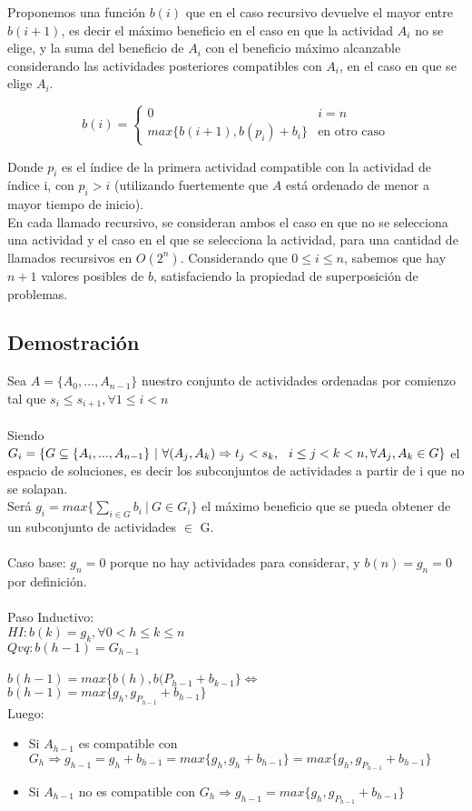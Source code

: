 \documentclass[10pt, a4paper]{article}
\begin{document}
Proponemos una función $b(i)$ que en el caso recursivo devuelve el mayor entre $b(i+1)$, es decir el máximo beneficio en el caso en que la actividad $A_i$ no se elige, y la suma del beneficio de $A_i$ con el beneficio máximo alcanzable considerando las actividades posteriores compatibles con $A_i$, en el caso en que se elige $A_i$.

$$b(i) = \begin{cases}
    0 & i = n \\
    max\{b(i+1), b(p_i) + b_i\} & \text{en otro caso}
\end{cases}$$

Donde $p_i$ es el índice de la primera actividad compatible con la actividad de índice i, con $p_i > i$ (utilizando fuertemente que $A$ está ordenado de menor a mayor tiempo de inicio). \\

En cada llamado recursivo, se consideran ambos el caso en que no se selecciona una actividad y el caso en el que se selecciona la actividad, para una cantidad de llamados recursivos en $O(2^n)$. Considerando que $0 \leq i \leq n$, sabemos que hay $n+1$ valores posibles de $b$, satisfaciendo la propiedad de superposición de problemas.

\subsection{Demostración}
Sea $A = \{A_0, ... , A_{n-1}\}$ nuestro conjunto de actividades ordenadas por comienzo tal que $s_i \leq s_{i+1},  \forall  1 \leq i < n$ \\ \\
Siendo $G_i = \{G \subseteq \{ A_i, ..., A_{n-1} \} \ | \ \forall (A_j, A_k) \Rightarrow t_j < s_k, \hspace{0.25cm} i \leq j < k < n, \forall A_j, A_k \in G \}$ el espacio de soluciones, es decir los subconjuntos de actividades a partir de i que no se solapan.
\\
Será $g_i = max \{ \sum_{i \in G } b_i \ | \ G \in G_i\}$ el máximo beneficio que se pueda obtener de un subconjunto de actividades $\in$ G. \\ \\
Caso base: $g_n = 0$ porque no hay actividades para considerar, y $b(n) = g_n = 0$ por definición. \\ \\
Paso Inductivo:\\
$HI: b(k) = g_k, \forall 0 < h \leq k \leq n$\\
$Qvq: b(h-1) = G_{h-1}$
\\ \\
$b(h-1) = max \{b(h), b(P_{h-1} + b_{k-1} \} \Leftrightarrow$
\\
$b(h-1) = max \{g_h, g_{P_{h-1}} + b_{h-1} \}$
\\ Luego:
\begin{itemize}
    \item Si $A_{h-1}$ es compatible con $G_h \Rightarrow g_{h-1} = g_h + b_{h-1} = max\{g_h, g_h + b_{h-1}\} = max\{g_h, g_{P_{h-1}} + b_{h-1}\}$
    \item Si $A_{h-1}$ no es compatible con $G_h \Rightarrow g_{h-1} = max\{g_h, g_{P_{h-1}} + b_{h-1}\}$
\end{itemize}
\end{document}
